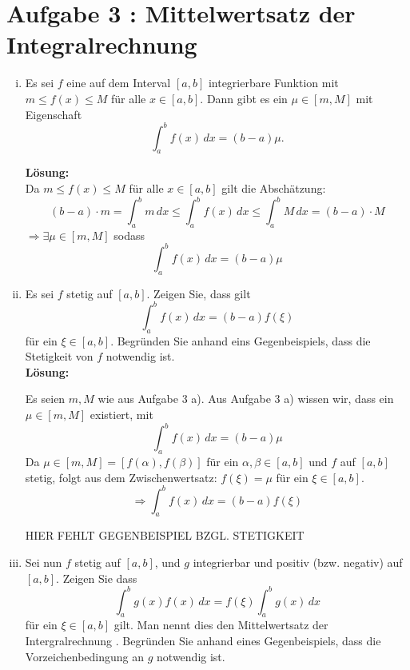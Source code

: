 \documentclass[11pt,a4paper,ngerman]{article}
\begin{document}
\section*{Aufgabe 3 : \mdseries Mittelwertsatz der Integralrechnung}

\begin{enumerate}[i)]
    \item Es sei $f$ eine auf dem Interval $[a,b]$ integrierbare Funktion mit $m \leq f(x) \leq M$ für alle $x\in[a,b]$. Dann gibt es ein $\mu \in [m,M]$ mit Eigenschaft
$$
    \int_{a}^{b} f(x) \, dx = (b - a) \mu.
$$

\textbf{Lösung:}\\
Da $m \leq f(x) \leq M$ für alle $x\in[a,b]$ gilt die Abschätzung:
$$
    (b-a)\cdot m = \int_{a}^{b} m \, dx \leq \int_{a}^{b} f(x) \, dx \leq \int_{a}^{b} M \, dx = (b-a) \cdot M
$$
$\Rightarrow \exists \mu \in \left[m,M\right]$ sodass
$$
    \int_{a}^{b} f(x) \, dx = (b - a) \mu
$$

    \item Es sei $f$ stetig auf $[a,b]$. Zeigen Sie, dass gilt 
$$
    \int_{a}^{b} f(x)\, dx = (b-a) f(\xi)
$$
für ein $\xi\in [a,b]$. Begründen Sie anhand eins Gegenbeispiels, dass die Stetigkeit von $f$ notwendig ist.\\

\textbf{Lösung:}

Es seien $m,M$ wie aus Aufgabe 3 a). Aus Aufgabe 3 a) wissen wir, dass ein $\mu \in \left[m,M\right]$ existiert, mit
$$
    \int_{a}^{b} f(x) \, dx = (b - a) \mu
$$
Da $\mu \in \left[m,M\right] = \left[f(\alpha),f(\beta)\right]$ für ein $\alpha,\beta \in [a,b]$ und $f$ auf $\left[a,b\right]$ stetig, folgt aus dem Zwischenwertsatz: $f(\xi) = \mu$ für ein $\xi \in \left[a,b\right]$.
$$
    \Rightarrow \int_{a}^{b} f(x)\, dx = (b-a) f(\xi)
$$

HIER FEHLT GEGENBEISPIEL BZGL. STETIGKEIT

    \item Sei nun $f$ stetig auf $[a,b]$, und $g$ integrierbar und positiv (bzw. negativ) auf $[a,b]$. Zeigen Sie dass 
$$
    \int_{a}^{b} g(x)f(x)\, dx = f(\xi) \int_{a}^{b} g(x) \, dx
$$ 
für ein $\xi \in [a,b]$ gilt. Man nennt dies den Mittelwertsatz der Intergralrechnung   . Begründen Sie anhand eines Gegenbeispiels, dass die Vorzeichenbedingung an $g$ notwendig ist. 
\end{enumerate}

\end{document}
